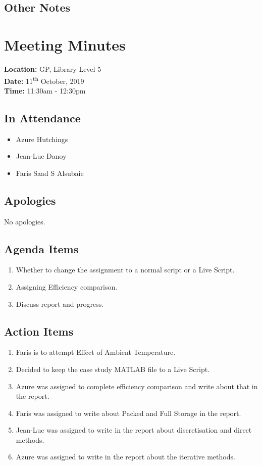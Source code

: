 \documentclass{article}
\begin{document}
\subsection*{Other Notes}

\pagebreak

\section{Meeting Minutes}
\textbf{Location:} GP, Library Level 5 \\
\textbf{Date:} 11\textsuperscript{th} October, 2019 \\
\textbf{Time:} 11:30am - 12:30pm

\subsection*{In Attendance}
\begin{itemize}
\item Azure Hutchings
\item Jean-Luc Danoy
\item Faris Saad S Alsubaie
\end{itemize}

\subsection*{Apologies}
No apologies. 

\subsection*{Agenda Items}
\begin{enumerate}
\item Whether to change the assignment to a normal script or a Live Script.
\item Assigning Efficiency comparison. 
\item Discuss report and progress.
\end{enumerate}

\subsection*{Action Items}
\begin{enumerate}
\item Faris is to attempt Effect of Ambient Temperature.
\item Decided to keep the case study MATLAB file to a Live Script.
\item Azure was assigned to complete efficiency comparison and write about that in the report.
\item Faris was assigned to write about Packed and Full Storage in the report.
\item Jean-Luc was assigned to write in the report about discretisation and direct methods.
\item Azure was assigned to write in the report about the iterative methods.
\end{enumerate}
\end{document}
